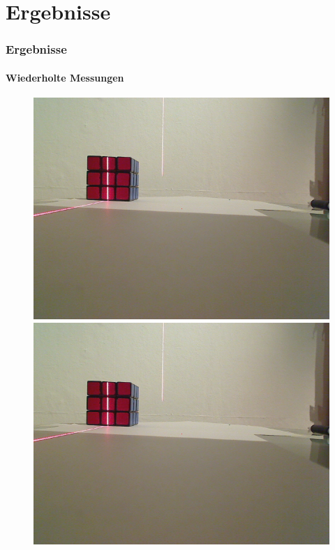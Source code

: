 \documentclass[xcolor=dvipsnames]{beamer}
\begin{document}
\section{Ergebnisse}
\begin{frame}
	\frametitle{Ergebnisse}
	\framesubtitle{Wiederholte Messungen}

	\begin{figure}
		\begin{minipage}{0.32\linewidth}
			\includegraphics[width=\linewidth]{includes/test_repeat_1}
		\end{minipage}
		\hfill
		\begin{minipage}{0.32\linewidth}
			\includegraphics[width=\linewidth]{includes/test_repeat_2}

\end{minipage}
\end{figure}
\end{frame}
\end{document}
